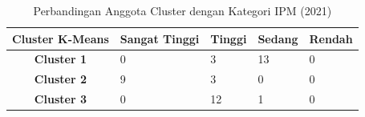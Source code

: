 \begin{table}[H]
\centering
\caption{Perbandingan Anggota Cluster dengan Kategori IPM (2021)} \label{tab:ipm_cross_2021}
\begin{tabular}{|c|p{2cm}|p{2cm}|p{2cm}|p{2cm}|}
\hline
\textbf{Cluster K-Means} & \textbf{Sangat Tinggi} & \textbf{Tinggi} & \textbf{Sedang} & \textbf{Rendah} \\ \hline
\textbf{Cluster 1} & 0 & 3 & 13 & 0 \\ \hline
\textbf{Cluster 2} & 9 & 3 & 0 & 0 \\ \hline
\textbf{Cluster 3} & 0 & 12 & 1 & 0 \\ \hline
\end{tabular}
\end{table}